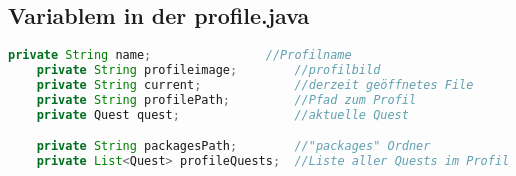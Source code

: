 \subsection{Variablem in der profile.java}
\begin{lstlisting}[language=JAVA]
	private String name;				//Profilname				
	private String profileimage;		//profilbild
	private String current;				//derzeit geöffnetes File
	private String profilePath;			//Pfad zum Profil
	private Quest quest;				//aktuelle Quest

	private String packagesPath;		//"packages" Ordner
	private List<Quest> profileQuests;	//Liste aller Quests im Profil
\end{lstlisting}
